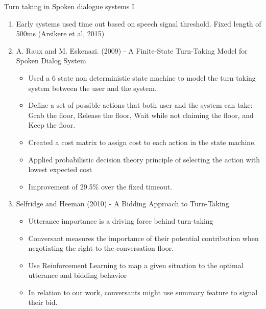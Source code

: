 \begin{frame} {Turn taking in Spoken dialogue systems I }
   \begin{enumerate}
         \item Early systems used time out based on speech signal threshold. Fixed length of 500ms (Arsikere et al, 2015)
         \item A. Raux and M. Eskenazi. (2009) - A Finite-State Turn-Taking Model for Spoken Dialog System
             \begin{itemize}
                \item Used a 6 state non deterministic state machine to model the turn taking system between the user and the system.
                \item Define a set of possible actions that both user and the system can take:
                      Grab the floor, Release the floor, Wait while not claiming the floor, and Keep
                      the floor.   
                \item Created a cost matrix to assign cost to each action in the state machine.
                \item Applied probabilistic decision theory principle of selecting the action with lowest expected cost
                \item Improvement of 29.5\% over the fixed timeout.    
             \end{itemize}  
         \item Selfridge and Heeman (2010) - A Bidding Approach to Turn-Taking
         \begin{itemize}
            \item Utterance importance is a driving force behind turn-taking
            \item Conversant measures the importance of their potential contribution when negotiating
                  the right to the conversation floor.
            \item Use Reinforcement Learning to map a given situation to the optimal utterance and bidding behavior  
             \item In relation to our work, conversants might use summary feature to signal their bid.        
         \end{itemize}
                 
   \end{enumerate}
 \end{frame}

